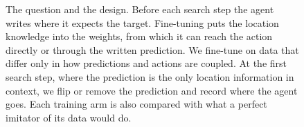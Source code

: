 \begin{figure}[t]
\caption{The question and the design. Before each search step the agent writes where it expects the target. Fine-tuning puts the location knowledge into the weights, from which it can reach the action directly or through the written prediction. We fine-tune on data that differ only in how predictions and actions are coupled. At the first search step, where the prediction is the only location information in context, we flip or remove the prediction and record where the agent goes. Each training arm is also compared with what a perfect imitator of its data would do.}
\label{fig:overview}
\end{figure}
